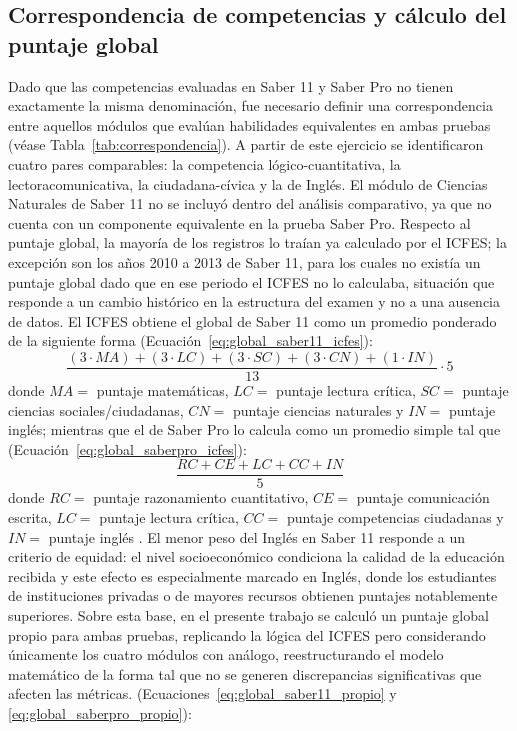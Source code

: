 \subsection{Correspondencia de competencias y cálculo del puntaje global}
Dado que las competencias evaluadas en Saber 11 y Saber Pro no tienen exactamente la misma denominación, fue necesario definir una correspondencia entre aquellos módulos que evalúan habilidades equivalentes en ambas pruebas (véase Tabla~\ref{tab:correspondencia}). A partir de este ejercicio se identificaron cuatro pares comparables: la competencia lógico-cuantitativa, la lectoracomunicativa, la ciudadana-cívica y la de Inglés. El módulo de Ciencias Naturales de Saber 11 no se incluyó dentro del análisis comparativo, ya que no cuenta con un componente equivalente en la prueba Saber Pro. Respecto al puntaje global, la mayoría de los registros lo traían ya calculado por el ICFES; la excepción son los años 2010 a 2013 de Saber 11, para los cuales no existía un puntaje global dado que en ese periodo el ICFES no lo calculaba, situación que responde a un cambio histórico en la estructura del examen y no a una ausencia de datos. El ICFES obtiene el global de Saber 11 como un promedio ponderado de la siguiente forma (Ecuación~\eqref{eq:global_saber11_icfes}):
\begin{equation}
\frac{(3 \cdot MA) + (3 \cdot LC) + (3 \cdot SC) + (3 \cdot CN) + (1 \cdot IN)}{13} \cdot 5
\label{eq:global_saber11_icfes}
\end{equation}
donde $MA =$ puntaje matemáticas, $LC =$ puntaje lectura crítica, $SC =$ puntaje ciencias sociales/ciudadanas, $CN =$ puntaje ciencias naturales y $IN =$ puntaje inglés; mientras que el de Saber Pro lo calcula como un promedio simple tal que (Ecuación~\eqref{eq:global_saberpro_icfes}):
\begin{equation}
\frac{RC + CE + LC + CC + IN}{5}
\label{eq:global_saberpro_icfes}
\end{equation}
donde $RC =$ puntaje razonamiento cuantitativo, $CE =$ puntaje comunicación escrita, $LC =$ puntaje lectura crítica, $CC =$ puntaje competencias ciudadanas y $IN =$ puntaje inglés \cite{ICFES_FichaMetodologica2022} \cite{MEN_SINEB_Aprendizaje2023}. El menor peso del Inglés en Saber 11 responde a un criterio de equidad: el nivel socioeconómico condiciona la calidad de la educación recibida y este efecto es especialmente marcado en Inglés, donde los estudiantes de instituciones privadas o de mayores recursos obtienen puntajes notablemente superiores. Sobre esta base, en el presente trabajo se calculó un puntaje global propio para ambas pruebas, replicando la lógica del ICFES pero considerando únicamente los cuatro módulos con análogo, reestructurando el modelo matemático de la forma tal que no se generen discrepancias significativas que afecten las métricas. (Ecuaciones~\eqref{eq:global_saber11_propio} y \eqref{eq:global_saberpro_propio}):
